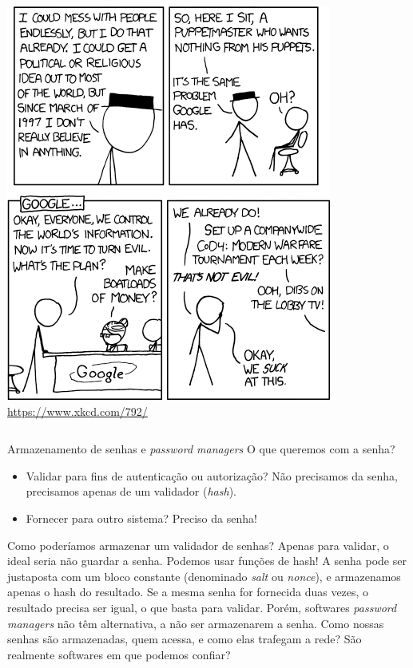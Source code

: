 \documentclass[utf8]{beamer}
\begin{document}
\begin{frame}
\begin{columns}[c]
    \includegraphics[width=\textwidth]{password_reuse_2.png}
    \url{https://www.xkcd.com/792/}
  \end{columns}
\end{frame}


\begin{frame}{Armazenamento de senhas e \emph{password managers}}
  O que queremos com a senha?
  \begin{itemize}
    \item Validar para fins de autenticação ou autorização?
          Não precisamos da senha,
          precisamos apenas de um validador (\emph{hash}).
    \item Fornecer para outro sistema? Preciso da senha!
  \end{itemize}
  \vfill
  Como poderíamos armazenar um validador de senhas?
  Apenas para validar, o ideal seria não guardar a senha.
  \vfill
  Podemos usar funções de hash!
  A senha pode ser justaposta
  com um bloco constante (denominado \emph{salt} ou \emph{nonce}),
  e armazenamos apenas o hash do resultado.
  Se a mesma senha for fornecida duas vezes,
  o resultado precisa ser igual, o que basta para validar.
  \vfill
  Porém, softwares \emph{password managers} não têm alternativa,
  a não ser armazenarem a senha.
  Como nossas senhas são armazenadas, quem acessa,
  e como elas trafegam a rede?
  São realmente softwares em que podemos confiar?
\end{frame}
\end{document}
